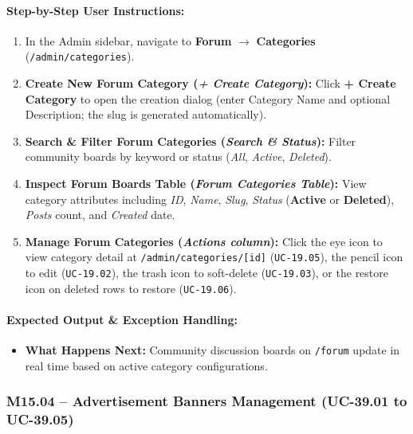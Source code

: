 \paragraph{Step-by-Step User Instructions:}
\begin{enumerate}[leftmargin=1.8em,itemsep=3pt]
  \item In the Admin sidebar, navigate to \textbf{Forum} $\rightarrow$ \textbf{Categories} (\texttt{/admin/categories}).
  \item {} \textbf{Create New Forum Category (\textit{+ Create Category}):} Click \textbf{+ Create Category} to open the creation dialog (enter Category Name and optional Description; the slug is generated automatically).
  \item {} \textbf{Search \& Filter Forum Categories (\textit{Search \& Status}):} Filter community boards by keyword or status (\textit{All}, \textit{Active}, \textit{Deleted}).
  \item {} \textbf{Inspect Forum Boards Table (\textit{Forum Categories Table}):} View category attributes including \textit{ID}, \textit{Name}, \textit{Slug}, \textit{Status} (\textbf{Active} or \textbf{Deleted}), \textit{Posts} count, and \textit{Created} date.
  \item {} \textbf{Manage Forum Categories (\textit{Actions column}):} Click the eye icon to view category detail at \texttt{/admin/categories/[id]} (\texttt{UC-19.05}), the pencil icon to edit (\texttt{UC-19.02}), the trash icon to soft-delete (\texttt{UC-19.03}), or the restore icon on deleted rows to restore (\texttt{UC-19.06}).
\end{enumerate}

\paragraph{Expected Output \& Exception Handling:}
\begin{itemize}[leftmargin=1.5em,itemsep=2pt]
  \item \textbf{What Happens Next:} Community discussion boards on \texttt{/forum} update in real time based on active category configurations.
\end{itemize}

\newpage
\subsubsection[M15.04 -- Advertisement Banners Management (UC-39.01--39.05)]{M15.04 -- Advertisement Banners Management (UC-39.01 to UC-39.05)}

